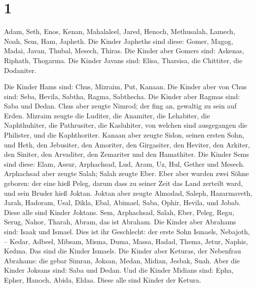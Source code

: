 \hypertarget{section}{%
\section{1}\label{section}}

 Adam, Seth, Enos,  Kenan, Mahalaleel,
Jared,  Henoch, Methusalah, Lamech,  Noah,
Sem, Ham, Japheth.  Die Kinder Japheths sind diese: Gomer,
Magog, Madai, Javan, Thubal, Mesech, Thiras.  Die Kinder
aber Gomers sind: Askenas, Riphath, Thogarma.  Die Kinder
Javans sind: Elisa, Tharsisa, die Chittiter, die Dodaniter.

 Die Kinder Hams sind: Chus, Mizraim, Put, Kanaan.
 Die Kinder aber von Chus sind: Seba, Hevila, Sabtha,
Ragma, Sabthecha. Die Kinder aber Ragmas sind: Saba und Dedan.
 Chus aber zeugte Nimrod; der fing an, gewaltig zu sein
auf Erden.  Mizraim zeugte die Luditer, die Anamiter, die
Lehabiter, die Naphthuhiter,  die Pathrusiter, die
Kasluhiter, von welchen sind ausgegangen die Philister, und die
Kaphthoriter.  Kanaan aber zeugte Sidon, seinen ersten
Sohn, und Heth,  den Jebusiter, den Amoriter, den
Girgasiter,  den Heviter, den Arkiter, den Siniter,
 den Arvaditer, den Zemariter und den Hamathiter.
 Die Kinder Sems sind diese: Elam, Assur, Arphachsad,
Lud, Aram, Uz, Hul, Gether und Mesech.  Arphachsad aber
zeugte Salah; Salah zeugte Eber.  Eber aber wurden zwei
Söhne geboren: der eine hieß Peleg, darum dass zu seiner Zeit das Land
zerteilt ward, und sein Bruder hieß Joktan.  Joktan aber
zeugte Almodad, Saleph, Hazarmaveth, Jarah,  Hadoram,
Usal, Dikla,  Ebal, Abimael, Saba,  Ophir,
Hevila, und Jobab. Diese alle sind Kinder Joktans.  Sem,
Arphachsad, Salah,  Eber, Peleg, Regu, 
Serug, Nahor, Tharah,  Abram, das ist Abraham.
 Die Kinder aber Abrahams sind: Isaak und Ismael.
 Dies ist ihr Geschlecht: der erste Sohn Ismaels,
Nebajoth, -- Kedar, Adbeel, Mibsam,  Misma, Duma, Massa,
Hadad, Thema,  Jetur, Naphis, Kedma. Das sind die Kinder
Ismaels.  Die Kinder aber Keturas, der Nebenfrau
Abrahams: die gebar Simran, Joksan, Medan, Midian, Jesbak, Suah. Aber
die Kinder Joksans sind: Saba und Dedan.  Und die Kinder
Midians sind: Epha, Epher, Hanoch, Abida, Eldaa. Diese alle sind Kinder
der Ketura.


